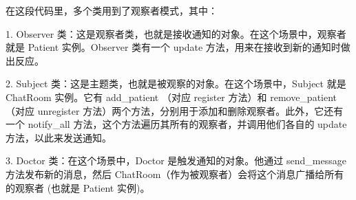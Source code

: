\documentclass[24pt,a4paper]{article}%
\begin{document}
在这段代码里，多个类用到了观察者模式，其中：

1. Observer 类：这是观察者类，也就是接收通知的对象。在这个场景中，观察者就是 Patient 实例。Observer 类有一个 update 方法，用来在接收到新的通知时做出反应。

2. Subject 类：这是主题类，也就是被观察的对象。在这个场景中，Subject 就是 ChatRoom 实例。它有 add\_patient （对应 register 方法）和 remove\_patient （对应 unregister 方法）两个方法，分别用于添加和删除观察者。此外，它还有一个 notify\_all 方法，这个方法遍历其所有的观察者，并调用他们各自的 update 方法，以此来发送通知。

3. Doctor 类：在这个场景中，Doctor 是触发通知的对象。他通过 send\_message 方法发布新的消息，然后 ChatRoom（作为被观察者）会将这个消息广播给所有的观察者 (也就是 Patient 实例)。

\newpage
\end{document}
